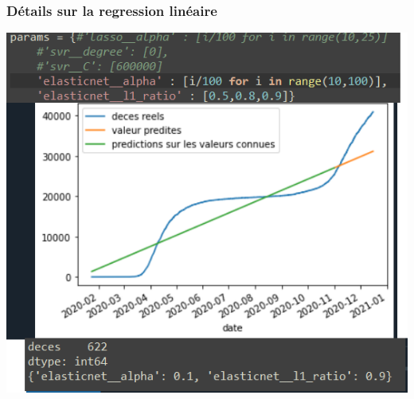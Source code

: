 \documentclass{beamer}[aspectratio = 43]
\begin{document}
\begin{frame}
	\frametitle{Détails sur la regression linéaire}
	\centering
	\includegraphics[scale=0.4]{EN_old}
\end{frame}
\end{document}
